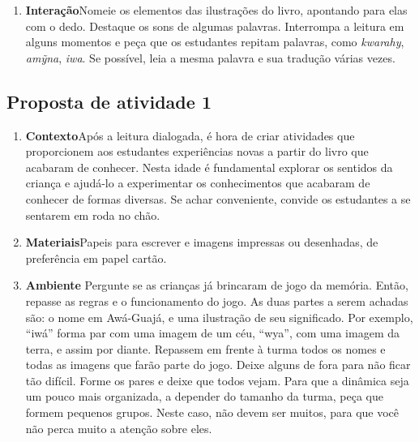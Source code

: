 \documentclass[11pt]{extarticle}
\begin{document}
{{\begin{enumerate}
Não tenha pressa em passar as páginas. Como são muitas palavras novas,
numa língua que eles não conhecem, selecione um pequeno número para
trabalhar. 

Não deixe que eles fiquem sem entender do que se trata. Crie 
um ambiente amigável onde a criança se sinta à vontade para fazer 
perguntas e comentários durante a leitura.


\item \textbf{Interação}\quad Nomeie os elementos das ilustrações 
do livro, apontando para elas com o dedo. Destaque os sons de algumas 
palavras. Interrompa a leitura em alguns momentos e peça que 
os estudantes repitam palavras, como \textit{kwarahy}, \textit{amỹna}, \textit{iwa}. Se possível, 
leia a mesma palavra e sua tradução várias vezes.
\end{enumerate}


\subsection{Proposta de atividade 1}

 

\begin{enumerate}
\item \textbf{Contexto}\quad Após a leitura dialogada, é hora de criar 
atividades que proporcionem aos estudantes experiências novas a partir do livro
que acabaram de conhecer. Nesta idade é fundamental explorar os sentidos da criança e 
ajudá-lo a experimentar os conhecimentos que acabaram de conhecer de formas diversas. Se achar 
conveniente, convide os estudantes a se sentarem em roda no chão.

\item \textbf{Materiais}\quad Papeis para escrever e imagens impressas ou desenhadas, de preferência
em papel cartão.

\item \textbf{Ambiente}\quad 
Pergunte se as crianças já brincaram de jogo da memória. Então, repasse as regras e o funcionamento
do jogo. As duas partes a serem achadas são: o nome em Awá-Guajá, e uma ilustração de 
seu significado. Por exemplo, ``iwá'' forma par com uma imagem de um céu, ``wya'', com uma imagem da terra,
e assim por diante. Repassem em frente à turma todos os nomes e todas as imagens que farão parte do jogo.
Deixe alguns de fora para não ficar tão difícil. Forme os pares e deixe que todos vejam. 
Para que a dinâmica seja um pouco mais organizada, a depender do tamanho da turma, peça
que formem pequenos grupos. Neste caso, não devem ser muitos, para que você não perca muito
a atenção sobre eles. 


\end{enumerate}}}
\end{document}
